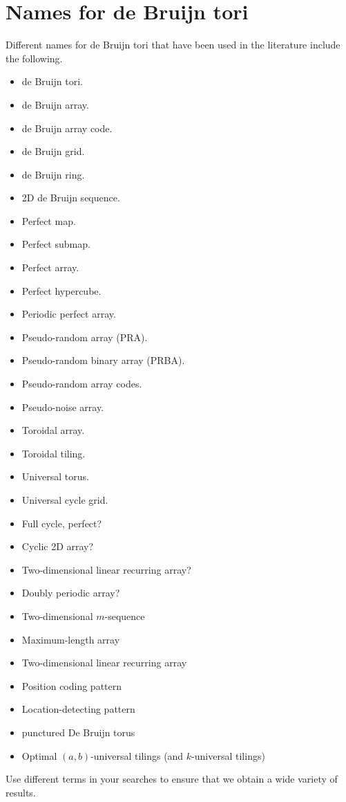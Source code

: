 \documentclass{article}
\begin{document}



\appendix

\section{Names for de Bruijn tori}
\label{sec:names}

Different names for de Bruijn tori that have been used in the literature include the following.
\begin{itemize}
  \item de Bruijn tori.
  \item de Bruijn array.
  \item de Bruijn array code.
  \item de Bruijn grid.
  \item de Bruijn ring.
  \item 2D de Bruijn sequence.
  \item Perfect map.
  \item Perfect submap. %
  \item Perfect array.
  \item Perfect hypercube.
  \item Periodic perfect array.
  \item Pseudo-random array (PRA).
  \item Pseudo-random binary array (PRBA).
  \item Pseudo-random array codes.
  \item Pseudo-noise array.
  \item Toroidal array.
  \item Toroidal tiling.
  \item Universal torus.
  \item Universal cycle grid.
  \item Full cycle, perfect? %
  \item Cyclic 2D array?
  \item Two-dimensional linear recurring array?
  \item Doubly periodic array?
  \item Two-dimensional $m$-sequence
  \item Maximum-length array
  \item Two-dimensional linear recurring array
  \item Position coding pattern %
  \item Location-detecting pattern %
  \item punctured De Bruijn torus
  \item Optimal $(a,b)$-universal tilings (and $k$-universal tilings)
\end{itemize}

Use different terms in your searches to ensure that we obtain a wide variety of results.
\end{document}
